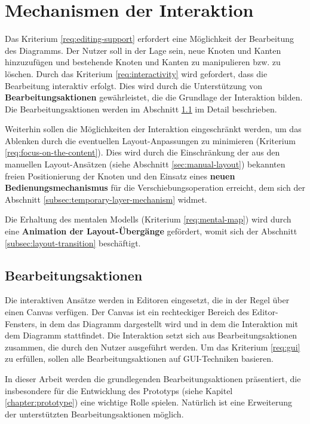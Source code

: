 
\section{Mechanismen der Interaktion}
\label{sec:interaction-mechanisms}

Das Kriterium \ref{req:editing-support} erfordert eine Möglichkeit der Bearbeitung des Diagramms. Der Nutzer soll in der Lage sein, neue Knoten und Kanten hinzuzufügen und bestehende Knoten und Kanten zu manipulieren bzw. zu löschen. Durch das Kriterium \ref{req:interactivity} wird gefordert, dass die Bearbeitung interaktiv erfolgt. Dies wird durch die Unterstützung von \textbf{Bearbeitungsaktionen} gewährleistet, die die Grundlage der Interaktion bilden. Die Bearbeitungsaktionen werden im Abschnitt \ref{subsec:edit-actions} im Detail beschrieben.

Weiterhin sollen die Möglichkeiten der Interaktion eingeschränkt werden, um das Ablenken durch die eventuellen Layout-Anpassungen zu minimieren (Kriterium \ref{req:focus-on-the-content}). Dies wird durch die Einschränkung der aus den manuellen Layout-Ansätzen (siehe Abschnitt \ref{sec:manual-layout}) bekannten freien Positionierung der Knoten und den Einsatz eines \textbf{neuen Bedienungsmechanismus} für die Verschiebungsoperation erreicht, dem sich der Abschnitt \ref{subsec:temporary-layer-mechanism} widmet.

Die Erhaltung des mentalen Modells (Kriterium \ref{req:mental-map}) wird durch eine \textbf{Animation der Layout-Übergänge} gefördert, womit sich der Abschnitt \ref{subsec:layout-transition} beschäftigt.

\subsection{Bearbeitungsaktionen}
\label{subsec:edit-actions}

Die interaktiven Ansätze werden in Editoren eingesetzt, die in der Regel über einen Canvas verfügen. Der Canvas ist ein rechteckiger Bereich des Editor-Fensters, in dem das Diagramm dargestellt wird und in dem die Interaktion mit dem Diagramm stattfindet. Die Interaktion setzt sich aus Bearbeitungsaktionen zusammen, die durch den Nutzer ausgeführt werden. Um das Kriterium \ref{req:gui} zu erfüllen, sollen alle Bearbeitungsaktionen auf GUI-Techniken basieren.

In dieser Arbeit werden die grundlegenden Bearbeitungsaktionen präsentiert, die insbesondere für die Entwicklung des Prototyps (siehe Kapitel \ref{chapter:prototype}) eine wichtige Rolle spielen. Natürlich ist eine Erweiterung der unterstützten Bearbeitungsaktionen möglich.

